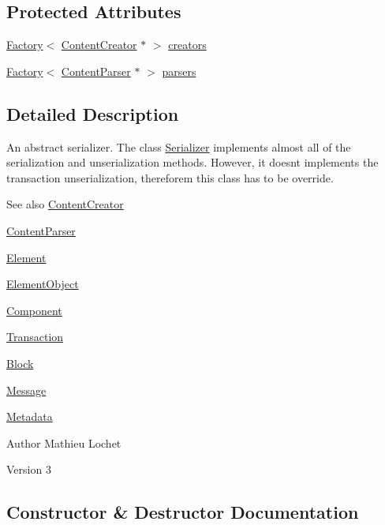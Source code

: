 \subsection*{Protected Attributes}
\begin{DoxyCompactItemize}
\item 
\mbox{\hyperlink{classFactory}{Factory}}$<$ \mbox{\hyperlink{classContentCreator}{Content\+Creator}} $\ast$ $>$ \mbox{\hyperlink{classSerializer_a7d26e865966b304350653b1246ec3340}{creators}}
\item 
\mbox{\hyperlink{classFactory}{Factory}}$<$ \mbox{\hyperlink{classContentParser}{Content\+Parser}} $\ast$ $>$ \mbox{\hyperlink{classSerializer_a96f96c01e6a471513669621751591fd9}{parsers}}
\end{DoxyCompactItemize}


\subsection{Detailed Description}
An abstract serializer. The class \mbox{\hyperlink{classSerializer}{Serializer}} implements almost all of the serialization and unserialization methods. However, it doesn\textquotesingle{}t implements the transaction unserialization, thereforem this class has to be override. \begin{DoxySeeAlso}{See also}
\mbox{\hyperlink{classContentCreator}{Content\+Creator}} 

\mbox{\hyperlink{classContentParser}{Content\+Parser}} 

\mbox{\hyperlink{classElement}{Element}} 

\mbox{\hyperlink{classElementObject}{Element\+Object}} 

\mbox{\hyperlink{classComponent}{Component}} 

\mbox{\hyperlink{classTransaction}{Transaction}} 

\mbox{\hyperlink{classBlock}{Block}} 

\mbox{\hyperlink{classMessage}{Message}} 

\mbox{\hyperlink{classMetadata}{Metadata}}
\end{DoxySeeAlso}
\begin{DoxyAuthor}{Author}
Mathieu Lochet 
\end{DoxyAuthor}
\begin{DoxyVersion}{Version}
3 
\end{DoxyVersion}


\subsection{Constructor \& Destructor Documentation}
\mbox{\label{classSerializer_a9fe7f31924098f75278d059f8443fd5b}} 
